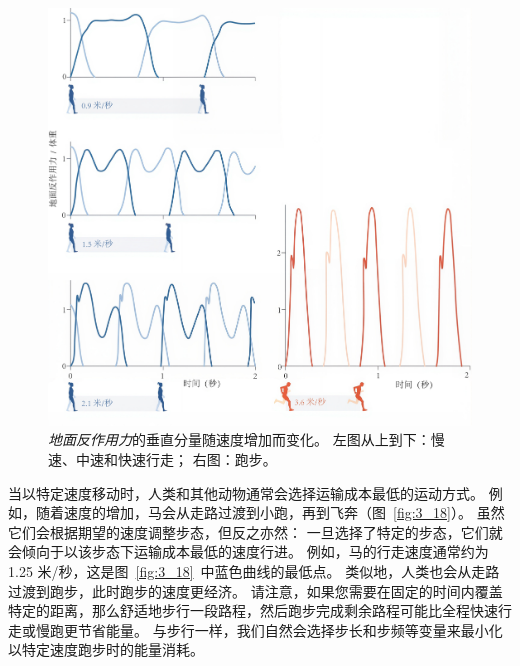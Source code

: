 \begin{figure}[!htb]
	\centering
	\includegraphics[width=1.0\linewidth]{chap3/3_17}
	\caption{\textit{地面反作用力}的垂直分量随速度增加而变化。
		左图从上到下：慢速、中速和快速行走；
		右图：跑步\cite{alexander1984walking}。 \label{fig:3_17}}
\end{figure}


当以特定速度移动时，人类和其他动物通常会选择运输成本最低的运动方式。
例如，随着速度的增加，马会从走路过渡到小跑，再到飞奔（图~\ref{fig:3_18}）。
虽然它们会根据期望的速度调整步态，但反之亦然：
一旦选择了特定的步态，它们就会倾向于以该步态下运输成本最低的速度行进。
例如，马的行走速度通常约为 1.25 米/秒，这是图~\ref{fig:3_18}~中蓝色曲线的最低点。
类似地，人类也会从走路过渡到跑步，此时跑步的速度更经济。
请注意，如果您需要在固定的时间内覆盖特定的距离，那么舒适地步行一段路程，然后跑步完成剩余路程可能比全程快速行走或慢跑更节省能量。
与步行一样，我们自然会选择步长和步频等变量来最小化以特定速度跑步时的能量消耗。

